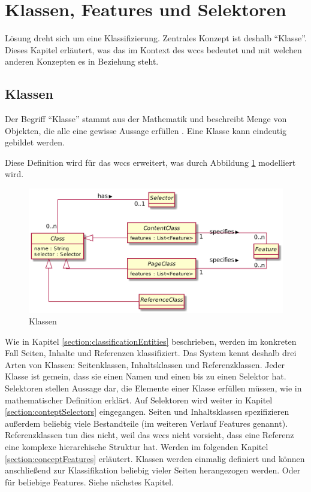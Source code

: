 \section{Klassen, Features und Selektoren}
    \label{section:conceptClassesFeaturesSelectors}
    Lösung dreht sich um eine Klassifizierung.
    Zentrales Konzept ist deshalb "`Klasse"'.
    Dieses Kapitel erläutert, was das im Kontext des \gls{wccs} bedeutet
    und mit welchen anderen Konzepten es in Beziehung steht.

    \subsection{Klassen}
        Der Begriff "`Klasse"' stammt aus der Mathematik und beschreibt Menge von Objekten,
        die alle eine gewisse Aussage erfüllen \cite{oberschelp:Mengenlehre}.
        Eine Klasse kann eindeutig gebildet werden.

        Diese Definition wird für das \gls{wccs} erweitert, was durch Abbildung \ref{image:conceptClasses}
        modelliert wird.

        \begin{figure}[htb]
            \centering
            \includegraphics[width=\textwidth]{../resources/concept/classes.png}
            \caption{Klassen}
            \label{image:conceptClasses}
        \end{figure}

        Wie in Kapitel \ref{section:classificationEntities} beschrieben,
        werden im konkreten Fall Seiten, Inhalte und Referenzen klassifiziert.
        Das System kennt deshalb drei Arten von Klassen: Seitenklassen, Inhaltsklassen
        und Referenzklassen.
        Jeder Klasse ist gemein, dass sie einen Namen und einen bis zu einen Selektor hat.
        Selektoren stellen Aussage dar, die Elemente einer Klasse erfüllen müssen,
        wie in mathematischer Definition erklärt.
        Auf Selektoren wird weiter in Kapitel \ref{section:conteptSelectors} eingegangen.
        Seiten und Inhaltsklassen spezifizieren außerdem beliebig viele Bestandteile
        (im weiteren Verlauf Features genannt).
        Referenzklassen tun dies nicht, weil das \gls{wccs} nicht vorsieht, dass eine Referenz eine komplexe hierarchische Struktur hat.
        Werden im folgenden Kapitel \ref{section:conceptFeatures} erläutert.
        Klassen werden einmalig definiert und können anschließend zur Klassifikation beliebig vieler Seiten herangezogen werden.
        Oder für beliebige Features. Siehe nächstes Kapitel.

